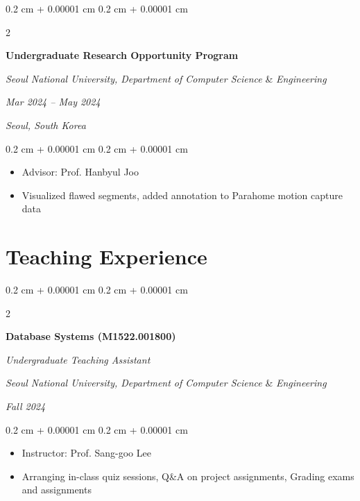 \documentclass[10pt, letterpaper]{article}
\newenvironment{highlights}{
    \begin{itemize}[
        topsep=0.10 cm,
        parsep=0.10 cm,
        partopsep=0pt,
        itemsep=0pt,
        leftmargin=0.4 cm + 10pt
    ]
}{
    \end{itemize}
} %
\newenvironment{onecolentry}{
    \begin{adjustwidth}{
        0.2 cm + 0.00001 cm
    }{
        0.2 cm + 0.00001 cm
    }
}{
    \end{adjustwidth}
} %
\newenvironment{twocolentry}[2][]{
    \onecolentry
    \def\secondColumn{#2}
    \setcolumnwidth{\fill, 4.5 cm}
    \begin{paracol}{2}
}{
    \switchcolumn \raggedleft \secondColumn
    \end{paracol}
    \endonecolentry
} %
\begin{document}
        \vspace{0.3 cm}

        \begin{twocolentry}{
        \textit{Mar 2024 – May 2024}
        
        \textit{Seoul, South Korea}}
            \textbf{Undergraduate Research Opportunity Program}
            
            \textit{Seoul National University,  Department of Computer Science} \& \textit{Engineering}
        \end{twocolentry}

        \vspace{0.10 cm}
        \begin{onecolentry}
            \begin{highlights}
                \item Advisor: Prof. Hanbyul Joo
                \item Visualized flawed segments, added annotation to Parahome motion capture data
            \end{highlights}
        \end{onecolentry}
         

    \section{Teaching Experience}

        \begin{twocolentry}{
            
        \textit{Fall 2024}}
            \textbf{Database Systems (M1522.001800)}
            
            \textit{Undergraduate Teaching Assistant}
    
            \textit{Seoul National University,  Department of Computer Science} \& \textit{Engineering}
        \end{twocolentry}

        \vspace{0.10 cm}
        \begin{onecolentry}
            \begin{highlights}
                \item Instructor: Prof. Sang-goo Lee
                \item Arranging in-class quiz sessions, Q\&A on project assignments, Grading exams and assignments
            \end{highlights}
        \end{onecolentry}
\end{document}
